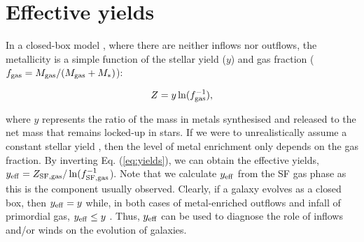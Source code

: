 \documentclass[useAMS,usenatbib]{mn2e}
\begin{document}
\section{Effective yields}
\label{sec:yields}
In a closed-box model \citep[e.g.][]{schmidt1963,tinsley1980}, where there are neither
inflows nor outflows, the metallicity is a simple function of the stellar yield ($y$)
and gas fraction ($f_{\rm gas} = M_{\rm gas} / (M_{\rm gas} + M_{*})$):

\begin{equation}
\label{eq:yields}
Z = y \ln ( f_{\rm gas}^{-1} ),
\end{equation}

\noindent
where $y$ represents the ratio of the mass in metals synthesised and released to the net
mass that remains locked-up in stars.
If we were to unrealistically assume a constant stellar yield \citep[e.g.][]{garnett2002, tremonti2004}, 
then the level of metal enrichment only depends on the gas fraction.
By inverting Eq. (\ref{eq:yields}), we can obtain the effective yields, 
$y_{\rm eff} = Z_{\rm SF,gas} / \ln ( f_{\rm SF,gas}^{-1}$). Note that we 
calculate $y_{\rm eff}$ from the SF gas phase as this is the component
usually observed.
Clearly, if a galaxy evolves as a closed box, then $y_{\rm eff} = y$ 
while, in both cases of metal-enriched outflows
and infall of primordial gas, $y_{\rm eff} \le y$ \citep{edmunds1990}. Thus, $y_{\rm eff}$ can be used to
diagnose the role of inflows and/or winds on the evolution of galaxies.
\end{document}
